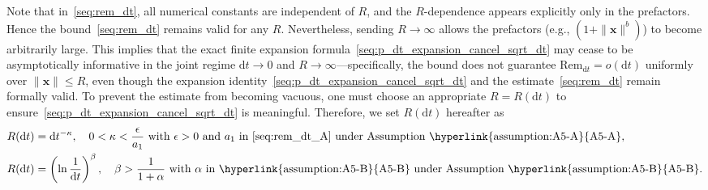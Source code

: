 Note that in~\eqref{seq:rem_dt}, all numerical constants are independent of $R$, and the $R$-dependence appears explicitly only in the prefactors. Hence the bound~\eqref{seq:rem_dt} remains valid for any $R$. Nevertheless, sending $R\rightarrow\infty$ allows the prefactors (e.g., $(1+\|\bm x\|^b)$) to become arbitrarily large. 
This implies that the exact finite expansion formula~\eqref{seq:p_dt_expansion_cancel_sqrt_dt} may cease to be asymptotically informative in the joint regime $\mathrm dt\rightarrow0$ and $R\rightarrow\infty$—specifically, the bound does not guarantee $\mathrm{Rem}_{\mathrm dt}=o(\mathrm dt)$ uniformly over $\|\bm x\|\leq R$, even though the expansion identity~\eqref{seq:p_dt_expansion_cancel_sqrt_dt} and the estimate~\eqref{seq:rem_dt} remain formally valid. 
To prevent the estimate from becoming vacuous, one must choose an appropriate $R=R(\mathrm dt)$ to ensure~\eqref{seq:p_dt_expansion_cancel_sqrt_dt} is meaningful. Therefore, we set $R(\mathrm dt)$ hereafter as
\begin{subequations}\label{seq:R_dt}
\renewcommand{\theequation}{\theparentequation-\Alph{equation}}
\begin{align}
    R(\mathrm dt)&=
    \mathrm dt^{-\kappa},
    \quad0<\kappa<\frac{\epsilon}{a_1}\text{ with }
    \epsilon>0
    \text{ and $a_1$ in~\eqref{seq:rem_dt_A} under Assumption~\hyperlink{assumption:A5-A}{A5-A}},
    \label{seq:R_dt_A}
    \\
    R(\mathrm dt)&=
    \left(\ln\frac{1}{\mathrm dt}\right)^\beta,
    \quad\beta>\frac{1}{1+\alpha}
    \text{ with $\alpha$ in~\hyperlink{assumption:A5-B}{A5-B} under Assumption~\hyperlink{assumption:A5-B}{A5-B}}.
    \label{seq:R_dt_B}
\end{align}
\end{subequations}

